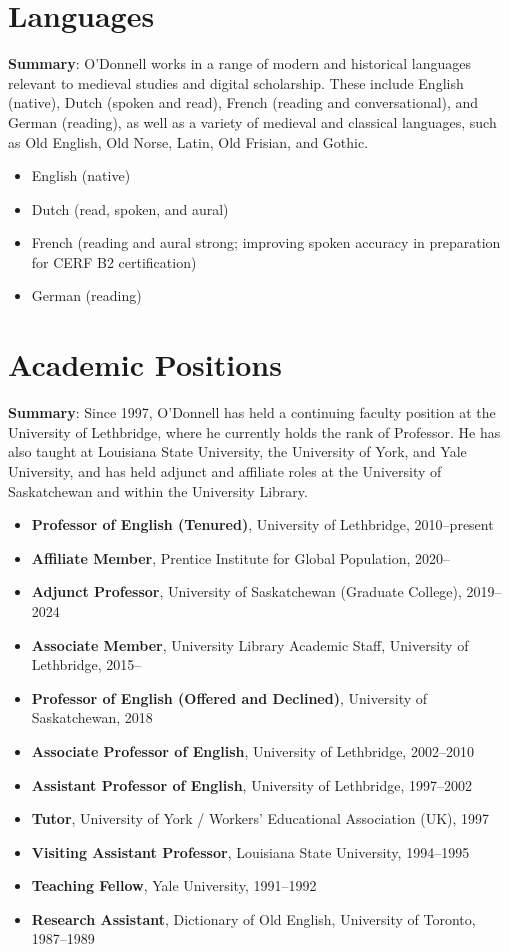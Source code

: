 \documentclass[12pt]{article}
\begin{document}
\section*{Languages}

\textbf{Summary}: O'Donnell works in a range of modern and historical languages relevant to medieval studies and digital scholarship. These include English (native), Dutch (spoken and read), French (reading and conversational), and German (reading), as well as a variety of medieval and classical languages, such as Old English, Old Norse, Latin, Old Frisian, and Gothic.

\begin{itemize}
  \item English (native)
  \item Dutch (read, spoken, and aural)
  \item French (reading and aural strong; improving spoken accuracy in preparation for CERF B2 certification)
  \item German (reading)
\end{itemize}


\section*{Academic Positions}

\textbf{Summary}: Since 1997, O'Donnell has held a continuing faculty position at the University of Lethbridge, where he currently holds the rank of Professor. He has also taught at Louisiana State University, the University of York, and Yale University, and has held adjunct and affiliate roles at the University of Saskatchewan and within the University Library.

\begin{itemize}
  \item \textbf{Professor of English (Tenured)}, University of Lethbridge, 2010–present
  \item \textbf{Affiliate Member}, Prentice Institute for Global Population, 2020–
  \item \textbf{Adjunct Professor}, University of Saskatchewan (Graduate College), 2019–2024
  \item \textbf{Associate Member}, University Library Academic Staff, University of Lethbridge, 2015–
  \item \textbf{Professor of English (Offered and Declined)}, University of Saskatchewan, 2018
  \item \textbf{Associate Professor of English}, University of Lethbridge, 2002–2010
  \item \textbf{Assistant Professor of English}, University of Lethbridge, 1997–2002
  \item \textbf{Tutor}, University of York / Workers’ Educational Association (UK), 1997
  \item \textbf{Visiting Assistant Professor}, Louisiana State University, 1994–1995
  \item \textbf{Teaching Fellow}, Yale University, 1991–1992
  \item \textbf{Research Assistant}, Dictionary of Old English, University of Toronto, 1987–1989
\end{itemize}
\end{document}
